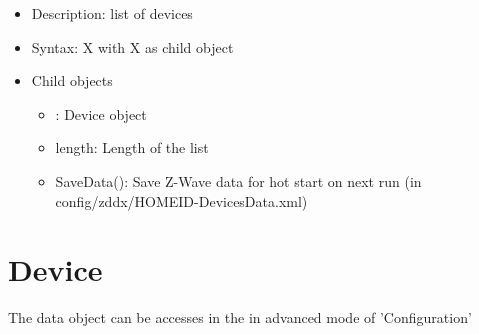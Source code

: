 \begin {itemize}
\item Description: list of devices
\item Syntax:  X with  X as child object
\item Child objects
\begin {itemize}
\item [m]: Device object
\item length: Length of the list
\item SaveData(): Save \zway Z-Wave data for hot start on next run (in config/zddx/HOMEID-DevicesData.xml)
\end {itemize}
\end {itemize}
 

\section{Device}

The data object can be accesses in the \zweui in advanced mode of 'Configuration'

